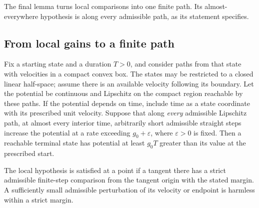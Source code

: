 The final lemma turns local comparisons into one finite path. Its
almost-everywhere hypothesis is along every admissible path, as its
statement specifies.

\subsection{From local gains to a finite path}

\begin{lemma}\label{ent:control}
Fix a starting state and a duration $T>0$, and consider paths
from that state with velocities in a compact convex box.
The states may be restricted to a closed linear half-space;
assume there is an available velocity
following its boundary.  Let the potential be continuous and
Lipschitz on the compact region reachable by these paths.
If the potential depends on time, include time as a state
coordinate with its prescribed unit velocity.
Suppose that along \emph{every} admissible Lipschitz path, at
almost every interior time, arbitrarily short admissible
straight steps increase the potential at a rate exceeding
$g_0+\varepsilon$, where $\varepsilon>0$ is fixed.  Then a
reachable terminal state has potential at least $g_0T$ greater
than its value at the prescribed start.

The local hypothesis is satisfied at a point if a tangent
there has a strict admissible finite-step comparison from the
tangent origin with the stated margin.  A sufficiently small
admissible perturbation of its velocity or endpoint is harmless
within a strict margin.
\end{lemma}

